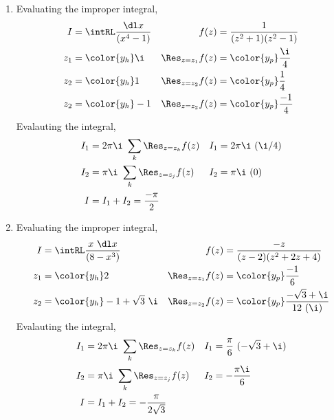 \begin{enumerate}
    \item Evaluating the improper integral,
          \begin{align}
              I                   & = \intRL \frac{\dl x}{(x^4 - 1)} &
              f(z)                & = \frac{1}{(z^2 + 1)(z^2 - 1)}     \\
              z_1                 & = \color{y_h} \i                 &
              \Res_{z = z_1} f(z) & = \color{y_p} \frac{\i}{4}         \\
              z_2                 & = \color{y_h} 1                  &
              \Res_{z = z_2} f(z) & = \color{y_p} \frac{1}{4}          \\
              z_2                 & = \color{y_h} -1                 &
              \Res_{z = z_2} f(z) & = \color{y_p} \frac{-1}{4}
          \end{align}
          Evalauting the integral,
          \begin{align}
              I_1 & = 2\pi\i\ \sum_{k} \Res_{z = z_k} f(z) &
              I_1 & = 2\pi\i\ (\i/4)                         \\
              I_2 & = \pi\i\ \sum_{k} \Res_{z = z_j} f(z)  &
              I_2 & = \pi\i\ (0)                             \\
              I   & = I_1 + I_2 = \frac{-\pi}{2}
          \end{align}

    \item Evaluating the improper integral,
          \begin{align}
              I                   & = \intRL \frac{x\ \dl x}{(8 - x^3)} &
              f(z)                & = \frac{-z}{(z-2)(z^2 + 2z + 4)}      \\
              z_1                 & = \color{y_h} 2                     &
              \Res_{z = z_1} f(z) & = \color{y_p} \frac{-1}{6}            \\
              z_2                 & = \color{y_h} -1 + \sqrt{3}\ \i     &
              \Res_{z = z_2} f(z) & = \color{y_p} \frac{-\sqrt{3} + \i}
              {12\ (\i)}
          \end{align}
          Evalauting the integral,
          \begin{align}
              I_1 & = 2\pi\i\ \sum_{k} \Res_{z = z_k} f(z) &
              I_1 & = \frac{\pi}{6}\ (-\sqrt{3} + \i)        \\
              I_2 & = \pi\i\ \sum_{k} \Res_{z = z_j} f(z)  &
              I_2 & = -\frac{\pi\i}{6}                       \\
              I   & = I_1 + I_2 = -\frac{\pi}{2\sqrt{3}}
          \end{align}


\end{enumerate}
